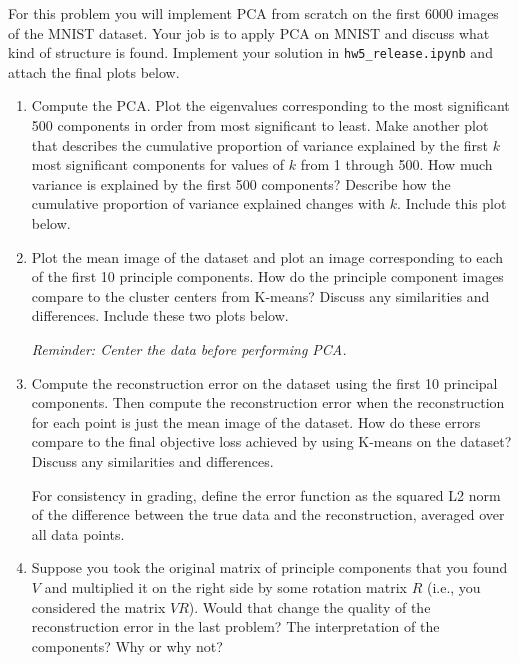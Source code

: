 \documentclass[submit]{../harvardml}
\begin{document}
\newpage

\begin{problem}[PCA]

  For this problem you will implement PCA from scratch on the first 6000 images of the MNIST dataset. Your job is to apply PCA on MNIST and discuss what kind of structure is found. Implement your solution in \texttt{hw5\_release.ipynb} and attach the final plots below. \\

  \begin{enumerate}

    \item Compute the PCA. Plot the eigenvalues corresponding to the most
    significant 500 components in order from most significant to
    least. Make another plot that describes the cumulative proportion of
    variance explained by the first $k$ most significant components for
    values of $k$ from 1 through 500.  How much variance is explained by
    the first 500 components?  Describe how the cumulative proportion of
    variance explained changes with $k$.  Include this plot below.

    \item Plot the mean image of the dataset and plot an image
    corresponding to each of the first 10 principle components.  How do
    the principle component images compare to the cluster centers from
    K-means? Discuss any similarities and differences.  Include these
    two plots below.
    
    \textit{Reminder: Center the data before performing PCA.}

    \item Compute the reconstruction error on the dataset using the first 10 principal components. Then compute the reconstruction error when the reconstruction for each point is just the mean
    image of the dataset. How do these errors compare to
    the final objective loss achieved by using K-means on the dataset?
    Discuss any similarities and differences.

    For consistency in grading, define the error function as the squared L2
    norm of the difference between the true data and the reconstruction, averaged over all data points.
  
    \item Suppose you took the original matrix of principle components
    that you found $V$ and multiplied it on the right side by some rotation matrix $R$ (i.e., you considered the matrix $VR$).
    Would that change the quality of the reconstruction error in the
    last problem?  The interpretation of the components?  Why or why
    not?

  \end{enumerate}
\end{problem}
\end{document}

